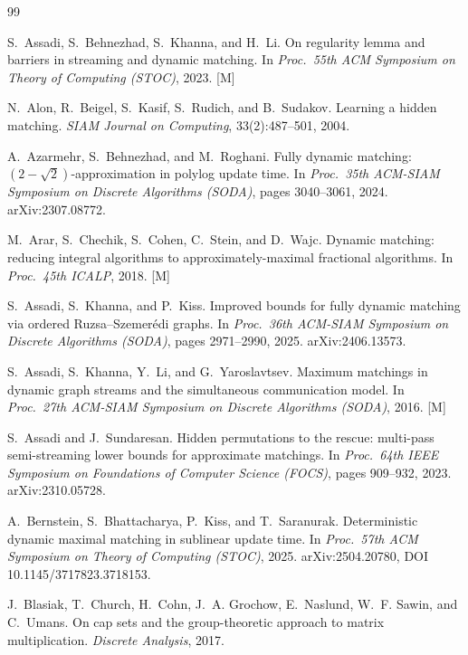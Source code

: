 \documentclass[11pt]{article}
\theoremstyle{definition}
\theoremstyle{remark}
\newcommand{\statusM}{\textcolor{orange!80!black}{\textsf{[M]}}}
\begin{document}
\begin{thebibliography}{99}
\small

S.~Assadi, S.~Behnezhad, S.~Khanna, and H.~Li.
On regularity lemma and barriers in streaming and dynamic matching.
In \emph{Proc.\ 55th ACM Symposium on Theory of Computing (STOC)}, 2023.
\statusM

N.~Alon, R.~Beigel, S.~Kasif, S.~Rudich, and B.~Sudakov.
Learning a hidden matching.
\emph{SIAM Journal on Computing}, 33(2):487--501, 2004.

A.~Azarmehr, S.~Behnezhad, and M.~Roghani.
Fully dynamic matching: $(2-\sqrt2)$-approximation in polylog update
time.
In \emph{Proc.\ 35th ACM-SIAM Symposium on Discrete Algorithms (SODA)},
pages 3040--3061, 2024. arXiv:2307.08772.

M.~Arar, S.~Chechik, S.~Cohen, C.~Stein, and D.~Wajc.
Dynamic matching: reducing integral algorithms to approximately-maximal
fractional algorithms.
In \emph{Proc.\ 45th ICALP}, 2018. \statusM

S.~Assadi, S.~Khanna, and P.~Kiss.
Improved bounds for fully dynamic matching via ordered
Ruzsa--Szemer\'edi graphs.
In \emph{Proc.\ 36th ACM-SIAM Symposium on Discrete Algorithms (SODA)},
pages 2971--2990, 2025. arXiv:2406.13573.

S.~Assadi, S.~Khanna, Y.~Li, and G.~Yaroslavtsev.
Maximum matchings in dynamic graph streams and the simultaneous
communication model.
In \emph{Proc.\ 27th ACM-SIAM Symposium on Discrete Algorithms (SODA)},
2016. \statusM

S.~Assadi and J.~Sundaresan.
Hidden permutations to the rescue: multi-pass semi-streaming lower
bounds for approximate matchings.
In \emph{Proc.\ 64th IEEE Symposium on Foundations of Computer Science
(FOCS)}, pages 909--932, 2023. arXiv:2310.05728.

A.~Bernstein, S.~Bhattacharya, P.~Kiss, and T.~Saranurak.
Deterministic dynamic maximal matching in sublinear update time.
In \emph{Proc.\ 57th ACM Symposium on Theory of Computing (STOC)}, 2025.
arXiv:2504.20780, DOI 10.1145/3717823.3718153.

J.~Blasiak, T.~Church, H.~Cohn, J.~A. Grochow, E.~Naslund, W.~F. Sawin,
and C.~Umans.
On cap sets and the group-theoretic approach to matrix multiplication.
\emph{Discrete Analysis}, 2017.


\end{thebibliography}
\end{document}
